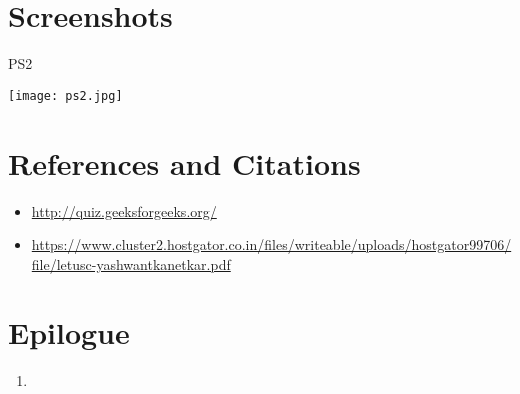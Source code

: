 \documentclass[11pt,a4paper]{article}
\begin{document}
\newpage

\section{Screenshots}
\begin{flushleft}




\vspace{2mm}




\Large{PS2}

\texttt{[image: ps2.jpg]}

\end{flushleft}
\newpage
\section{References and Citations}
\begin{itemize}
\item\url{http://quiz.geeksforgeeks.org/}
\item\url{https://www.cluster2.hostgator.co.in/files/writeable/uploads/hostgator99706/file/letusc-yashwantkanetkar.pdf}
\end{itemize}
\newpage
\section{Epilogue}
\begin{enumerate}
\item 




  
\end{enumerate}
\end{document}

